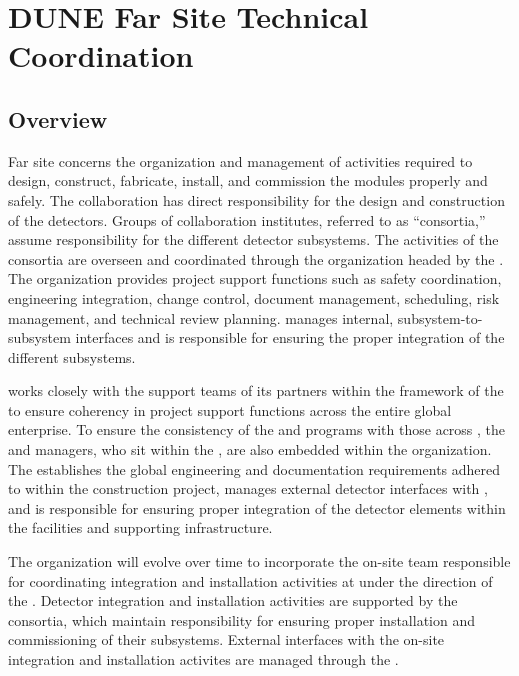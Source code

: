 \chapter{DUNE Far Site Technical Coordination}
\label{ch:exec-tc}

\section{Overview}

Far site  concerns the organization and management of 
activities required to design, construct,
fabricate, install, and commission the   modules properly and safely. 
      The  collaboration has direct responsibility for the design 
and construction of the  detectors.  Groups of collaboration 
institutes, referred to as ``consortia,'' assume responsibility for 
the different detector subsystems.  The activities of the consortia are 
overseen and coordinated through the   organization 
headed by the  .  The  organization 
provides project support functions such as safety coordination, 
engineering integration, change control, document management, scheduling, 
risk management, and technical review planning.    
manages internal, subsystem-to-subsystem interfaces and is responsible 
for ensuring the proper integration of the different subsystems.   

  works closely with the support teams of its 
 partners within the framework of the  to 
ensure coherency in project support functions across the entire global 
enterprise.  To ensure the consistency of the   
and  programs with those across , the 
  and  managers, who sit within 
the , are also embedded within the   
organization.  The  establishes the global engineering
and documentation requirements adhered to within the  
 construction project, manages external  detector 
interfaces with , and is responsible for ensuring proper 
integration of the  detector elements within the facilities 
and supporting infrastructure.  

The  organization will evolve over time to incorporate the 
on-site team responsible for coordinating integration and installation 
activities at  under the direction of the .  
Detector integration and installation activities are supported by the 
 consortia, which maintain responsibility for ensuring 
proper installation and commissioning of their subsystems.  External 
 interfaces with the on-site integration and installation 
activites are managed through the .

